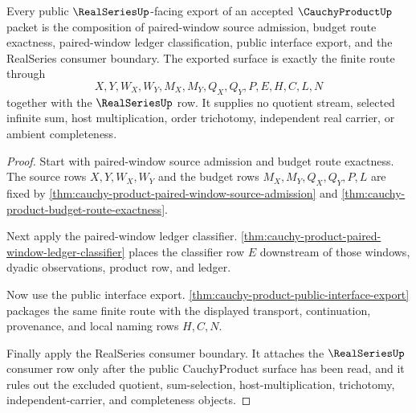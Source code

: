 \begin{theorem}
\label{thm:cauchy-product-public-real-series-export}
Every public $\RealSeriesUp$-facing export of an accepted $\CauchyProductUp$ packet is the composition of paired-window source admission, budget route exactness, paired-window ledger classification, public interface export, and the RealSeries consumer boundary. The exported surface is exactly the finite route through
$$
X,Y,W_X,W_Y,M_X,M_Y,Q_X,Q_Y,P,E,H,C,L,N
$$
together with the $\RealSeriesUp$ row. It supplies no quotient stream, selected infinite sum, host multiplication, order trichotomy, independent real carrier, or ambient completeness.
\end{theorem}
\begin{proof}
Start with paired-window source admission and budget route exactness. The source rows $X,Y,W_X,W_Y$ and the budget rows $M_X,M_Y,Q_X,Q_Y,P,L$ are fixed by \autoref{thm:cauchy-product-paired-window-source-admission} and \autoref{thm:cauchy-product-budget-route-exactness}.

Next apply the paired-window ledger classifier. \autoref{thm:cauchy-product-paired-window-ledger-classifier} places the classifier row $E$ downstream of those windows, dyadic observations, product row, and ledger.

Now use the public interface export. \autoref{thm:cauchy-product-public-interface-export} packages the same finite route with the displayed transport, continuation, provenance, and local naming rows $H,C,N$.

Finally apply the RealSeries consumer boundary. It attaches the $\RealSeriesUp$ consumer row only after the public CauchyProduct surface has been read, and it rules out the excluded quotient, sum-selection, host-multiplication, trichotomy, independent-carrier, and completeness objects.
\end{proof}


